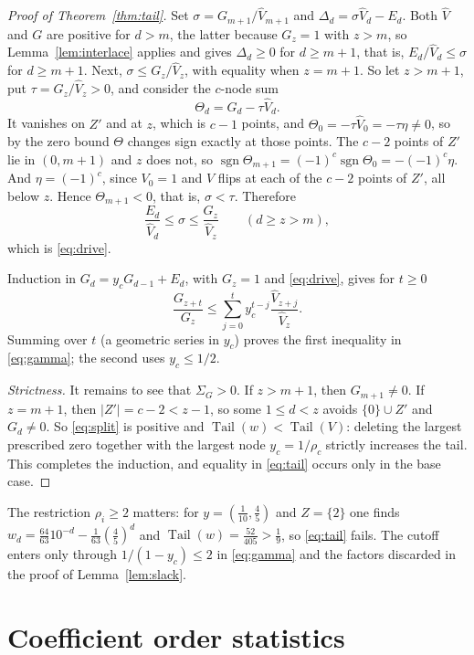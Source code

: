 \documentclass[11pt]{article}
\DeclareMathOperator{\Tail}{Tail}
\DeclareMathOperator{\sgn}{sgn}
\begin{document}
\begin{proof}[Proof of Theorem~\ref{thm:tail}]
Set $\sigma=G_{m+1}/\widehat V_{m+1}$ and
$\Delta_d=\sigma\widehat V_d-E_d$.  Both $\widehat V$ and $G$ are positive for
$d>m$, the latter because $G_z=1$ with $z>m$, so Lemma~\ref{lem:interlace}
applies and gives $\Delta_d\ge0$ for $d\ge m+1$, that is,
$E_d/\widehat V_d\le\sigma$ for $d\ge m+1$.  Next, $\sigma\le G_z/\widehat V_z$, with equality
when $z=m+1$.  So let $z>m+1$, put $\tau=G_z/\widehat V_z>0$, and consider
the $c$-node sum
\[
  \Theta_d=G_d-\tau\widehat V_d .
\]
It vanishes on $Z'$ and at $z$, which is $c-1$ points, and
$\Theta_0=-\tau\widehat V_0=-\tau\eta\ne0$, so by the zero bound $\Theta$
changes sign exactly at those points.  The $c-2$ points of $Z'$ lie in
$(0,m+1)$ and $z$ does not, so $\sgn\Theta_{m+1}=(-1)^{c}\sgn\Theta_0
=-(-1)^{c}\eta$.  And $\eta=(-1)^{c}$, since $V_0=1$ and $V$ flips at each of
the $c-2$ points of $Z'$, all below $z$.  Hence $\Theta_{m+1}<0$, that is,
$\sigma<\tau$.  Therefore
\[
  \frac{E_d}{\widehat V_d}\le\sigma\le\frac{G_z}{\widehat V_z}
  \qquad(d\ge z>m),
\]
which is \eqref{eq:drive}.

Induction in $G_d=y_cG_{d-1}+E_d$, with $G_z=1$ and
\eqref{eq:drive}, gives for $t\ge0$
\[
  \frac{G_{z+t}}{G_z}
  \le\sum_{j=0}^t y_c^{t-j}
       \frac{\widehat V_{z+j}}{\widehat V_z}.
\]
Summing over $t$ (a geometric series in $y_c$) proves the first inequality
in \eqref{eq:gamma}; the second uses $y_c\le1/2$.

\emph{Strictness.}  It remains to see that $\Sigma_G>0$.  If $z>m+1$, then
$G_{m+1}\ne0$.  If $z=m+1$, then $|Z'|=c-2<z-1$, so some $1\le d<z$ avoids
$\{0\}\cup Z'$ and $G_d\ne0$.  So \eqref{eq:split} is positive and
$\Tail(w)<\Tail(V)$: deleting the largest prescribed zero together with the
largest node $y_c=1/\rho_c$ strictly increases the tail.  This completes the induction, and
equality in \eqref{eq:tail} occurs only in the base case.
\end{proof}

The restriction $\rho_i\ge2$ matters: for $y=(\frac1{10},\frac45)$ and
$Z=\{2\}$ one finds $w_d=\frac{64}{63}10^{-d}-\frac1{63}(\frac45)^d$ and
$\Tail(w)=\frac{52}{405}>\frac19$, so \eqref{eq:tail} fails.  The cutoff
enters only through $1/(1-y_c)\le2$ in \eqref{eq:gamma} and the factors
discarded in the proof of Lemma~\ref{lem:slack}.

\section{Coefficient order statistics}
\end{document}
